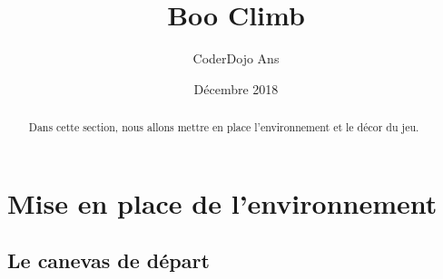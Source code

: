 \documentclass[french]{article}
\title{Boo Climb}
\author{CoderDojo Ans}
\date{Décembre 2018}
\begin{document}
\begin{titlepage}
	\maketitle
\end{titlepage}

\tableofcontents{}
\newpage

\section{Mise en place de l'environnement}

\begin{abstract}
	Dans cette section, nous allons mettre en place l'environnement et le décor du jeu.
\end{abstract}
	
\subsection{Le canevas de départ}	



	
\end{document}
